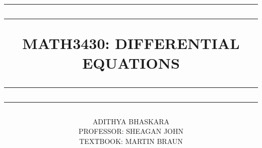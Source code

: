 \title{

    \rule{15cm}{1.6pt}\vspace*{-\baselineskip}\vspace*{2pt}
    \rule{15cm}{0.4pt}
	
	\vspace{0.75\baselineskip}
		
	\Huge{MATH3430: DIFFERENTIAL EQUATIONS\\\vspace{3mm}}

	\rule{15cm}{0.4pt}\vspace*{-\baselineskip}\vspace{3.2pt}
	\rule{15cm}{1.6pt}

}

\author{ADITHYA BHASKARA\\\vspace{0.4cm}\small{PROFESSOR: SHEAGAN JOHN}\\\vspace{1em}\small{TEXTBOOK: MARTIN BRAUN}}

\date{}